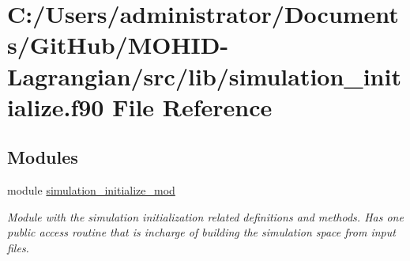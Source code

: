 \hypertarget{simulation__initialize_8f90}{}\section{C\+:/\+Users/administrator/\+Documents/\+Git\+Hub/\+M\+O\+H\+I\+D-\/\+Lagrangian/src/lib/simulation\+\_\+initialize.f90 File Reference}
\label{simulation__initialize_8f90}
\subsection*{Modules}
\begin{DoxyCompactItemize}
\item 
module \mbox{\hyperlink{namespacesimulation__initialize__mod}{simulation\+\_\+initialize\+\_\+mod}}
\begin{DoxyCompactList}\small\item\em Module with the simulation initialization related definitions and methods. Has one public access routine that is incharge of building the simulation space from input files. \end{DoxyCompactList}\end{DoxyCompactItemize}
